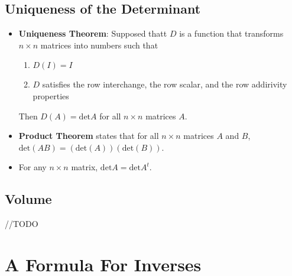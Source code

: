 \subsection{Uniqueness of the Determinant}

\begin{itemize}
  \item \textbf{Uniqueness Theorem}: Supposed thatt $D$ is a function that transforms $n \times n$ matrices into numbers such that
    \begin{enumerate}[label={(\alph*)}]
      \item $D(I) = I$
      \item $D$ satisfies the row interchange, the row scalar, and the row addirivity properties
    \end{enumerate}
    Then $D(A) = \mathrm{det} A$ for all $n \times n$ matrices $A$.
  \item \textbf{Product Theorem} states that for all $n \times n$ matrices $A$ and $B$, $\mathrm{det}(AB) = (\mathrm{det}(A))(\mathrm{det}(B))$.
  \item For any $n \times n$ matrix, $\mathrm{det} A = \mathrm{det} A^t$.
\end{itemize}

\subsection{Volume}

//TODO

\section{A Formula For Inverses}

